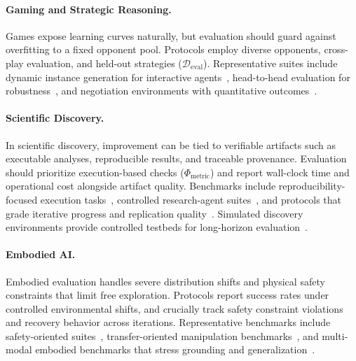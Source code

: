 \paragraph{Gaming and Strategic Reasoning.}
Games expose learning curves naturally, but evaluation should guard against overfitting to a fixed opponent pool. Protocols employ diverse opponents, cross-play evaluation, and held-out strategies ($\mathcal{D}_{\text{eval}}$). Representative suites include dynamic instance generation for interactive agents~\citep{chalamalasetti-etal-2023-clembench, beyer2024clembench2024challengingdynamiccomplementary}, head-to-head evaluation for robustness~\citep{costarelli2024gamebench}, and negotiation environments with quantitative outcomes~\citep{abdelnabi2024llmdeliberation, duan2024gtbenchuncoveringstrategicreasoning}.

\paragraph{Scientific Discovery.}
In scientific discovery, improvement can be tied to verifiable artifacts such as executable analyses, reproducible results, and traceable provenance. Evaluation should prioritize execution-based checks ($\Phi_{\text{metric}}$) and  report wall-clock time and operational cost alongside artifact quality. Benchmarks include reproducibility-focused execution tasks~\citep{siegel2024corebenchfosteringcredibilitypublished}, controlled research-agent suites~\citep{bragg2025astabenchrigorousbenchmarkingai}, and protocols that grade iterative progress and replication quality~\citep{starace2025paperbenchevaluatingaisability}. Simulated discovery environments provide controlled testbeds for long-horizon evaluation~\citep{jansen2024discoveryworldvirtualenvironmentdeveloping, chen2025physgym}.

\paragraph{Embodied AI.}
Embodied evaluation  handles severe distribution shifts and physical safety constraints that limit free exploration. Protocols report success rates under controlled environmental shifts, and crucially track safety constraint violations and recovery behavior across iterations. Representative benchmarks include safety-oriented suites~\citep{yin2025safeagentbenchbenchmarksafetask}, transfer-oriented manipulation benchmarks~\citep{gu2023maniskill2unifiedbenchmarkgeneralizable}, and multi-modal embodied benchmarks that stress grounding and generalization~\citep{yang2025embodiedbenchcomprehensivebenchmarkingmultimodal}.

